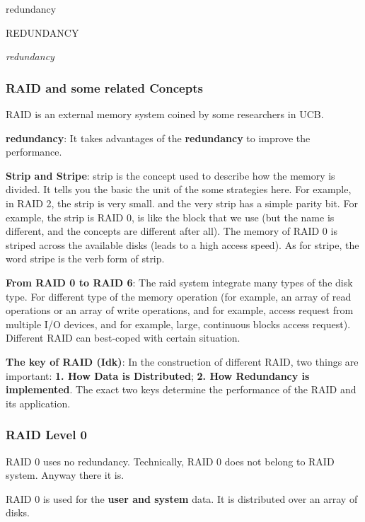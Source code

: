 \documentclass[11pt]{article}
\begin{document}
\begin{center}
redundancy
\end{center}

REDUNDANCY

\emph{redundancy}

\subsubsection{RAID and some related Concepts}
\label{sec:org06a3c37}

RAID is an external memory system coined by some researchers in UCB.

\textbf{redundancy}: It takes advantages of the \textbf{redundancy} to improve the performance.

\textbf{Strip and Stripe}:  strip is the concept used to describe how the memory is divided. It tells you the basic the unit of the some strategies here. For example, in RAID 2, the strip is very small. and the very strip has a simple parity bit. For example, the strip is RAID 0, is like the block that we use (but the name is different, and the concepts are different after all). The memory of RAID 0 is striped across the available disks (leads to a high access speed). 
As for stripe, the word stripe is the verb form of strip.

\textbf{From RAID 0 to RAID 6}: The raid system integrate many types of the disk type. For different type of the memory operation (for example, an array of read operations or an array of write operations, and for example, access request from multiple I/O devices, and for example, large, continuous blocks access request). Different RAID can best-coped with certain situation.

\textbf{The key of RAID (Idk)}: In the construction of different RAID, two things are important: \textbf{1. How Data is Distributed}; \textbf{2. How Redundancy is implemented}. The exact two keys determine the performance of the RAID and its application.

\subsubsection{RAID Level 0}
\label{sec:org8f3f0ca}

RAID 0 uses no redundancy. Technically, RAID 0 does not belong to RAID system. Anyway there it is.

RAID 0 is used for the \textbf{user and system} data. It is distributed over an array of disks.
\end{document}
